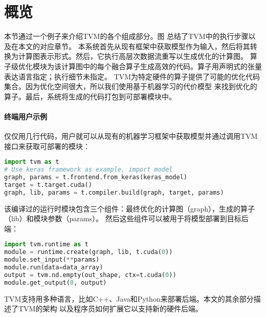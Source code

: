 \section{概览}
本节通过一个例子来介绍TVM的各个组成部分。图 总结了TVM中的执行步骤以及在本文的对应章节。
本系统首先从现有框架中获取模型作为输入，然后将其转换为计算图表示形式。然后，它执行高层次数据流重写以生成优化的计算图。
算子级优化模块为该计算图中的每个融合算子生成高效的代码。算子用声明式的张量表达语言指定；执行细节未指定。
TVM为特定硬件的算子提供了可能的优化代码集合。因为优化空间很大，所以我们使用基于机器学习的代价模型
来找到优化的算子。最后，系统将生成的代码打包到可部署模块中。

\paragraph{终端用户示例}
仅仅用几行代码，用户就可以从现有的机器学习框架中获取模型并通过调用TVM接口来获取可部署的模块：

\begin{lstlisting}[language={Python}]
import tvm as t
# Use keras framework as example, import model
graph, params = t.frontend.from_keras(keras_model)
target = t.target.cuda()
graph, lib, params = t.compiler.build(graph, target, params) 
\end{lstlisting}

该编译过的运行时模块包含三个组件：最终优化的计算图（graph），生成的算子（lib）和模块参数（params）。
然后这些组件可以被用于将模型部署到目标后端：

\begin{lstlisting}[language={Python}]
import tvm.runtime as t
module = runtime.create(graph, lib, t.cuda(0))
module.set_input(**params)
module.run(data=data_array)
output = tvm.nd.empty(out_shape, ctx=t.cuda(0))
module.get_output(0, output)
\end{lstlisting}

TVM支持用多种语言，比如C++、Java和Python来部署后端。本文的其余部分描述了TVM的架构
以及程序员如何扩展它以支持新的硬件后端。